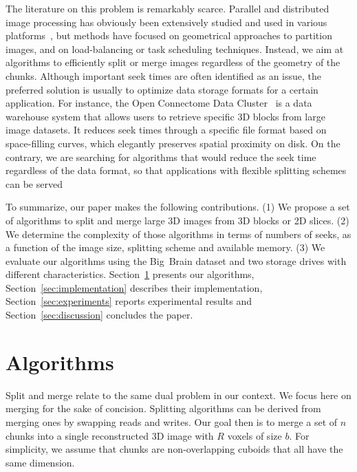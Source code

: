 \documentclass[10pt, conference, compsocconf]{IEEEtran}
\begin{document}
The literature on this problem is remarkably scarce. Parallel and
distributed image processing has obviously been extensively studied
and used in various
platforms~\cite{miguet1991elastic,tang2007eman2,yang2008parallel,braunl2013parallel,moise2013terabyte,bajcsy2013terabyte},
but methods have focused on geometrical approaches to partition images,
and on load-balancing or task scheduling techniques. Instead, we
aim at algorithms to efficiently split or merge images regardless of
the geometry of the chunks. Although important seek times are often
identified as an issue, the preferred solution is usually to optimize
data storage formats for a certain application.  For instance, the
Open Connectome Data Cluster~\cite{burns2013open} is a data warehouse
system that allows users to retrieve specific 3D blocks from large
image datasets. It reduces seek times through a specific file format
based on space-filling curves, which elegantly preserves spatial
proximity on disk. On the contrary, we are searching for algorithms
that would reduce the seek time regardless of the data format, so that
applications with flexible splitting schemes can be served

To summarize, our paper makes the following contributions. (1) We
propose a set of algorithms to split and merge large 3D images from 3D
blocks or 2D slices. (2) We determine the complexity of those
algorithms in terms of numbers of seeks, as a function of the image
size, splitting scheme and available memory. (3) We evaluate our
algorithms using the Big~Brain dataset and two storage drives with
different characteristics.  Section~\ref{sec:algos} presents our
algorithms, Section~\ref{sec:implementation} describes their
implementation, Section~\ref{sec:experiments} reports experimental
results and Section~\ref{sec:discussion} concludes the paper.


\section{Algorithms}
\label{sec:algos}

Split and merge relate to the same dual problem in our context. We
focus here on merging for the sake of concision. Splitting algorithms
can be derived from merging ones by swapping reads and writes. Our
goal then is to merge a set of $n$ chunks into a single reconstructed
3D image with $R$ voxels of size $b$. For simplicity, we assume that
chunks are non-overlapping cuboids that all have the same dimension.
\end{document}

